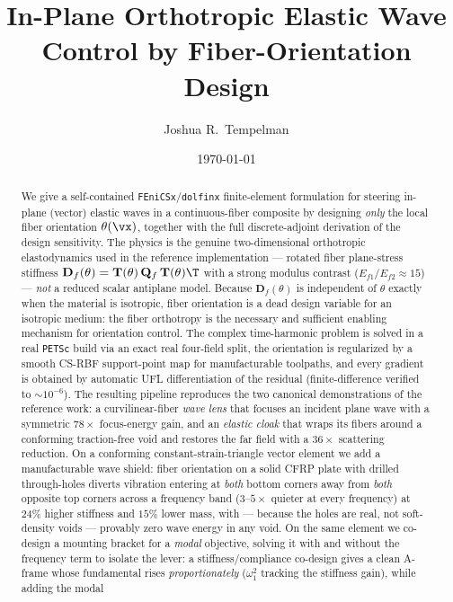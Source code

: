 \documentclass[11pt]{article}
\title{\bfseries In-Plane Orthotropic Elastic Wave Control by
Fiber-Orientation Design}
\author{Joshua R.~Tempelman}
\date{\today}
\begin{document}
\maketitle

\begin{abstract}
We give a self-contained \texttt{FEniCSx}/\texttt{dolfinx} finite-element
formulation for steering in-plane (vector) elastic waves in a continuous-fiber
composite by designing \emph{only} the local fiber orientation $\theta(\vx)$,
together with the full discrete-adjoint derivation of the design sensitivity.
The physics is the genuine two-dimensional orthotropic elastodynamics used in the
reference implementation --- rotated fiber plane-stress stiffness
$\mathbf D_f(\theta)=\mathbf T(\theta)\,\mathbf Q_f\,\mathbf T(\theta)\T$ with a
strong modulus contrast ($E_{f1}/E_{f2}\approx15$) --- \emph{not} a reduced
scalar antiplane model. Because $\mathbf D_f(\theta)$ is independent of $\theta$
exactly when the material is isotropic, fiber orientation is a dead design
variable for an isotropic medium: the fiber orthotropy is the necessary and
sufficient enabling mechanism for orientation control. The complex time-harmonic
problem is solved in a real \texttt{PETSc} build via an exact real four-field
split, the orientation is regularized by a smooth CS-RBF support-point map for
manufacturable toolpaths, and every gradient is obtained by automatic UFL
differentiation of the residual (finite-difference verified to $\sim\!10^{-6}$).
The resulting pipeline reproduces the two canonical demonstrations of the
reference work: a curvilinear-fiber \emph{wave lens} that focuses an incident
plane wave with a symmetric $78\times$ focus-energy gain, and an \emph{elastic cloak} that
wraps its fibers around a conforming traction-free void and restores the far field with a $36\times$
scattering reduction. On a conforming constant-strain-triangle vector element we add
a manufacturable wave shield: fiber orientation on a solid CFRP plate with drilled
through-holes diverts vibration entering at \emph{both} bottom corners away from
\emph{both} opposite top corners across a frequency band ($3$--$5\times$ quieter at
every frequency) at $24\%$ higher stiffness and $15\%$ lower mass, with --- because
the holes are real, not soft-density voids --- provably zero wave energy in any void.
On the same element we co-design a mounting bracket for a \emph{modal} objective,
solving it with and without the frequency term to isolate the lever: a
stiffness/compliance co-design gives a clean A-frame whose fundamental rises
\emph{proportionately} ($\omega_1^2$ tracking the stiffness gain), while adding the modal

\end{abstract}
\end{document}

